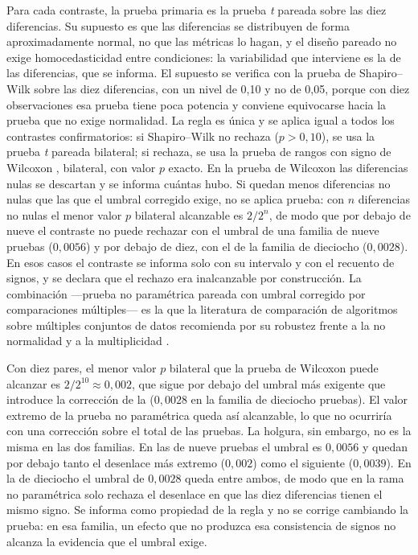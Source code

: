 Para cada contraste, la prueba primaria es la prueba \emph{t} pareada sobre las
diez diferencias. Su supuesto es que las diferencias se distribuyen de forma
aproximadamente normal, no que las métricas lo hagan, y el diseño pareado no
exige homocedasticidad entre condiciones: la variabilidad que interviene es la
de las diferencias, que se informa. El supuesto se verifica con la prueba de
Shapiro--Wilk \cite{shapiro1965} sobre las diez diferencias, con un nivel de
0,10 y no de 0,05,
porque con diez observaciones esa prueba tiene poca potencia y conviene
equivocarse hacia la prueba que no exige normalidad. La regla es única y se
aplica igual a todos los contrastes confirmatorios: si Shapiro--Wilk no
rechaza ($p>0{,}10$), se usa la prueba \emph{t} pareada bilateral; si rechaza,
se usa la prueba de rangos con signo de Wilcoxon \cite{wilcoxon1945},
bilateral, con valor $p$ exacto. En la prueba de Wilcoxon las diferencias nulas
se descartan y se
informa cuántas hubo. Si quedan menos diferencias no nulas que las que el
umbral corregido exige, no se aplica prueba: con $n$ diferencias no nulas el
menor valor $p$ bilateral alcanzable es $2/2^{n}$, de modo que por debajo de
nueve el contraste no puede rechazar con el umbral de una familia de nueve
pruebas ($0{,}0056$) y por debajo de diez, con el de la familia de dieciocho
($0{,}0028$). En esos casos el contraste se informa solo con su intervalo y
con el recuento de signos, y se declara que el rechazo era inalcanzable por
construcción. La combinación ---prueba no paramétrica pareada con umbral
corregido por comparaciones múltiples--- es la que la literatura de comparación
de algoritmos sobre múltiples conjuntos de datos recomienda por su robustez
frente a la no normalidad y a la multiplicidad \cite{demsar2006}.

Con diez pares, el menor valor $p$ bilateral que la prueba de Wilcoxon puede
alcanzar es $2/2^{10}\approx 0{,}002$, que sigue por debajo del umbral más
exigente que introduce la corrección de la 
($0{,}0028$ en la familia de dieciocho pruebas). El valor extremo de la prueba
no paramétrica queda así alcanzable, lo que no ocurriría con una corrección
sobre el total de las pruebas. La holgura, sin embargo, no es la misma en las
dos familias. En las de nueve pruebas el umbral es $0{,}0056$ y quedan por
debajo tanto el desenlace más extremo ($0{,}002$) como el siguiente
($0{,}0039$). En la de dieciocho el umbral de $0{,}0028$ queda entre ambos, de
modo que en la rama no paramétrica solo rechaza el desenlace en que las diez
diferencias tienen el mismo signo. Se informa como propiedad de la regla y no
se corrige cambiando la prueba: en esa familia, un efecto que no produzca esa
consistencia de signos no alcanza la evidencia que el umbral exige.

